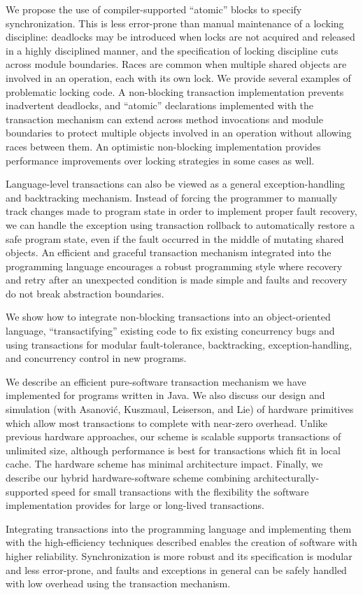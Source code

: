 \documentclass[twoside,twocolumn,notitlepage,letterpaper,9pt]{article}
\begin{document}
We propose the use of compiler-supported ``atomic'' blocks to specify
synchronization.  This is less error-prone than manual maintenance of
a locking discipline: deadlocks may be introduced when locks are not
acquired and released in a highly disciplined manner, and the
specification of locking discipline cuts across module boundaries.
Races are common when multiple shared objects are involved in an
operation, each with its own lock.  We provide several examples of
problematic locking code.  A non-blocking transaction implementation
prevents inadvertent deadlocks, and ``atomic'' declarations
implemented with
the transaction mechanism can extend across method invocations and
module boundaries to protect multiple objects involved in an operation
without allowing races between them.  An optimistic non-blocking
implementation provides performance improvements over locking
strategies in some cases as well.

Language-level transactions can also be viewed as a general
exception-handling and backtracking mechanism.  Instead of forcing the
programmer to manually track changes made to program state in order to
implement proper fault recovery, we can handle the exception using
transaction rollback to automatically restore a safe program state,
even if the fault occurred in the middle of mutating shared objects.
An efficient and graceful transaction mechanism integrated into the
programming language encourages a robust programming style where
recovery and retry after an unexpected condition is made simple and
faults and recovery do not break abstraction boundaries.

We show how to integrate non-blocking transactions into an
object-oriented language, ``transactifying'' existing code to fix
existing concurrency bugs and using transactions for modular fault-tolerance,
backtracking, exception-handling, and concurrency control in new
programs.

We describe an efficient pure-software transaction mechanism we have
implemented for programs written in Java.  We also discuss our design
and simulation (with Asanovi\'c, Kuszmaul, Leiserson, and Lie) of
hardware primitives which allow most transactions to complete with
near-zero overhead.  Unlike previous hardware approaches, our scheme
is scalable supports transactions of unlimited size, although
performance is best for transactions which fit in local cache.  The
hardware scheme has minimal architecture impact.  Finally, we describe
our hybrid hardware-software scheme combining
architecturally-supported speed for small transactions with the
flexibility the software implementation provides for large or
long-lived transactions.

Integrating transactions into the programming language and
implementing them with the high-efficiency techniques described
enables the creation of software with higher reliability.
Synchronization is more robust and its specification is modular and less
error-prone, and faults and exceptions in general can be safely handled
with low overhead using the transaction mechanism.

%
%
\end{document}
